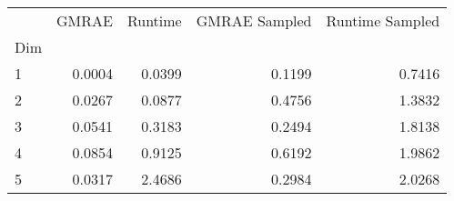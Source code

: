 \begin{tabular}{lrrrr}
\toprule
{} &  GMRAE &  Runtime &  GMRAE Sampled &  Runtime Sampled \\
Dim &        &          &                &                  \\
\midrule
1   & 0.0004 &   0.0399 &         0.1199 &           0.7416 \\
2   & 0.0267 &   0.0877 &         0.4756 &           1.3832 \\
3   & 0.0541 &   0.3183 &         0.2494 &           1.8138 \\
4   & 0.0854 &   0.9125 &         0.6192 &           1.9862 \\
5   & 0.0317 &   2.4686 &         0.2984 &           2.0268 \\
\bottomrule
\end{tabular}
